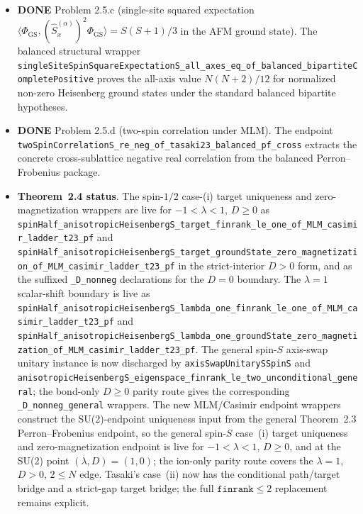 \documentclass[a4paper,11pt]{article}
\begin{document}
\begin{itemize}
  2.5.a).  The graph-local chain reaches the closed-form degree wrappers
  \texttt{tasaki25b\_heisenbergHamiltonianOnGraphS\_half\_lower\_bound\_closed\_form}
  and
  \texttt{tasaki25b\_heisenbergHamiltonianOnGraphS\_half\_lower\_bound\_degree\_closed\_form}.
\item \textbf{DONE} Problem 2.5.c (single-site squared expectation
  $\langle\Phi_{\mathrm{GS}},(\hat S_x^{(\alpha)})^2
  \Phi_{\mathrm{GS}}\rangle = S(S+1)/3$ in the AFM ground state).  The
  balanced structural wrapper
  \texttt{singleSiteSpinSquareExpectationS\_all\_axes\_eq\_of\_balanced\_bipartiteCompletePositive}
  proves the all-axis value $N(N+2)/12$ for normalized non-zero Heisenberg
  ground states under the standard balanced bipartite hypotheses.
\item \textbf{DONE} Problem 2.5.d (two-spin correlation under MLM).  The
  endpoint
  \texttt{twoSpinCorrelationS\_re\_neg\_of\_tasaki23\_balanced\_pf\_cross}
  extracts the concrete cross-sublattice negative real correlation from the
  balanced Perron--Frobenius package.
\item \textbf{Theorem~2.4 status}.  The spin-$1/2$ case-(i) target uniqueness
  and zero-magnetization wrappers are live for
  \(-1<\lambda<1\), \(D\ge 0\) as
  \texttt{spinHalf\_anisotropicHeisenbergS\_target\_finrank\_le\_one\_of\_MLM\_casimir\_ladder\_t23\_pf}
  and
  \texttt{spinHalf\_anisotropicHeisenbergS\_target\_groundState\_zero\_magnetization\_of\_MLM\_casimir\_ladder\_t23\_pf}
  in the strict-interior \(D>0\) form, and as the suffixed
  \texttt{\_D\_nonneg} declarations for the \(D=0\) boundary.  The
  \(\lambda=1\) scalar-shift boundary is live as
  \texttt{spinHalf\_anisotropicHeisenbergS\_lambda\_one\_finrank\_le\_one\_of\_MLM\_casimir\_ladder\_t23\_pf}
  and
  \texttt{spinHalf\_anisotropicHeisenbergS\_lambda\_one\_groundState\_zero\_magnetization\_of\_MLM\_casimir\_ladder\_t23\_pf}.
  The general spin-$S$ axis-swap unitary instance is now discharged by
  \texttt{axisSwapUnitarySSpinS} and
  \texttt{anisotropicHeisenbergS\_eigenspace\_finrank\_le\_two\_unconditional\_general};
  the bond-only \(D\ge0\) parity route gives the corresponding
  \texttt{\_D\_nonneg\_general} wrappers.  The new MLM/Casimir endpoint
  wrappers construct the SU(2)-endpoint uniqueness input from the general
  Theorem~2.3 Perron--Frobenius endpoint, so the general spin-$S$ case~(i)
  target uniqueness and zero-magnetization endpoint is live for
  \(-1<\lambda<1\), \(D\ge0\), and at the SU(2) point
  \((\lambda,D)=(1,0)\); the ion-only parity route covers the
  \(\lambda=1\), \(D>0\), \(2\le N\) edge.  Tasaki's case~(ii) now has the
  conditional path/target bridge and a strict-gap target bridge; the full
  \(\texttt{finrank}\le2\) replacement remains explicit.
\end{itemize}
\end{document}
